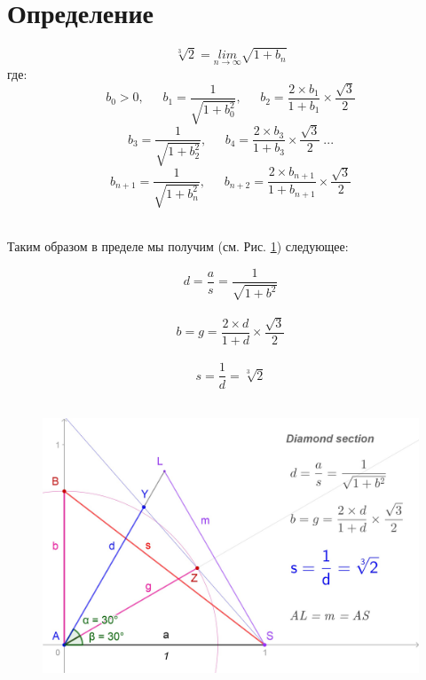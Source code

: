 \documentclass[12pt, letterpaper, oneside]{report}
\begin{document}
\section{Определение}
\begin{equation}
\sqrt[3]{2}= \underset{n\to \infty }{lim} \sqrt{1+b_{n}}
\end{equation}
где:   
\begin{equation}
b_{0} > 0,\ \hspace{15pt} b_{1}=\dfrac{1}{\sqrt{1+b_{0}^{2}}},\ \hspace{15pt} b_{2}=\frac{2\times b_{1}}{1+b_{1}}\times\frac{\sqrt{3}}{2}
\end{equation}
\begin{equation}
b_{3}=\dfrac{1}{\sqrt{1+b_{2}^{2}}},\ \hspace{15pt} b_{4}=\frac{2\times b_{3}}{1+b_{3}}\times\frac{\sqrt{3}}{2} \ ...
\end{equation}
\begin{equation}
b_{n+1}=\dfrac{1}{\sqrt{1+b_{n}^{2}}},\ \hspace{15pt} b_{n+2}=\frac{2\times b_{n+1}}{1+b_{n+1}}\times\frac{\sqrt{3}}{2}
\end{equation}
\\

\begin{center}
	Таким образом в пределе мы получим (см. Рис. \ref{fig:definition}) следующее:
\end{center}
\begin{equation}
d=\frac{a}{s}=\frac{1}{\sqrt{1+b^{2}}}
\end{equation}
\\
\begin{equation}
 b=g=\frac{2\times d}{1+d}\times\frac{\sqrt{3}}{2}
\end{equation}
\\
\begin{equation}
s=\dfrac{1}{d}=\sqrt[3]{2}
\end{equation}
\\
\begin{figure}[h]
	\centering
	\includegraphics[width=0.7\linewidth]{images/ds_new_def.jpg}
	\caption{}
	\label{fig:definition}
\end{figure} \\
\end{document}
